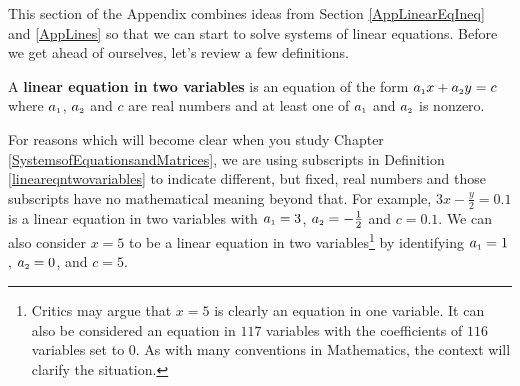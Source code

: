 \documentclass{ximera}
\begin{document}
	\author{Stitz-Zeager}




\setcounter{footnote}{0}

\label{AppLinearSystems}

\setlength{\extrarowheight}{0pt}

This section of the Appendix combines ideas from Section \ref{AppLinearEqIneq} and \ref{AppLines} so that we can start to solve systems of linear equations.  Before we get ahead of ourselves, let's review a few definitions.

\medskip

\colorbox{ResultColor}{\bbm

\begin{defn}  \label{lineareqntwovariables}  A \textbf{linear equation in two variables} is an equation of the form $a_{\mbox{\tiny$1$}} x + a_{\mbox{\tiny$2$}} y = c$ where $a_{\mbox{\tiny$1$}}$, $a_{\mbox{\tiny$2$}}$ and $c$ are real numbers and at least one of $a_{\mbox{\tiny$1$}}$ and $a_{\mbox{\tiny$2$}}$ is nonzero.

\end{defn}

\ebm}

\medskip

For reasons which will become clear when you study Chapter \ref{SystemsofEquationsandMatrices}, we are using subscripts in Definition \ref{lineareqntwovariables} to indicate different, but fixed, real numbers and those subscripts have no mathematical meaning beyond that.  For example, $3x - \frac{y}{2} = 0.1$ is a linear equation in two variables with $a_{\mbox{\tiny$1$}} = 3$, $a_{\mbox{\tiny$2$}} = -\frac{1}{2}$ and $c = 0.1$.  We can also consider $x = 5$ to be a linear equation in two variables\footnote{Critics may argue that $x=5$ is clearly an equation in one variable.  It can also be considered an equation in $117$ variables with the coefficients of $116$ variables set to $0$.  As with many conventions in Mathematics, the context will clarify the situation.} by identifying $a_{\mbox{\tiny$1$}} = 1$, $a_{\mbox{\tiny$2$}} = 0$, and $c = 5$.  

\medskip
\end{document}
